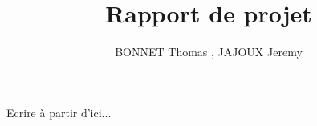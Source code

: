 \documentclass[12pt]{article}
\title{Rapport de projet}
\date{}
\author{BONNET Thomas , JAJOUX Jeremy}
\begin{document}
\maketitle

Ecrire à partir d'ici...
\end{document}
